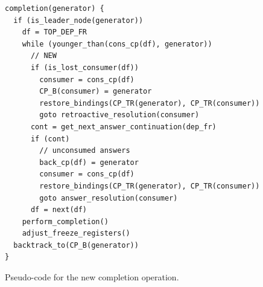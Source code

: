 \begin{figure}[ht]
\begin{Verbatim}
completion(generator) {
  if (is_leader_node(generator))
    df = TOP_DEP_FR
    while (younger_than(cons_cp(df), generator))
      // NEW
      if (is_lost_consumer(df))
        consumer = cons_cp(df)
        CP_B(consumer) = generator
        restore_bindings(CP_TR(generator), CP_TR(consumer))
        goto retroactive_resolution(consumer)
      cont = get_next_answer_continuation(dep_fr)
      if (cont)
        // unconsumed answers
        back_cp(df) = generator
        consumer = cons_cp(df)
        restore_bindings(CP_TR(generator), CP_TR(consumer))
        goto answer_resolution(consumer)
      df = next(df)
    perform_completion()
    adjust_freeze_registers()
  backtrack_to(CP_B(generator))
}
\end{Verbatim}
\caption{Pseudo-code for the new completion operation.}
\label{fig:completion_operation_retro}
\end{figure}